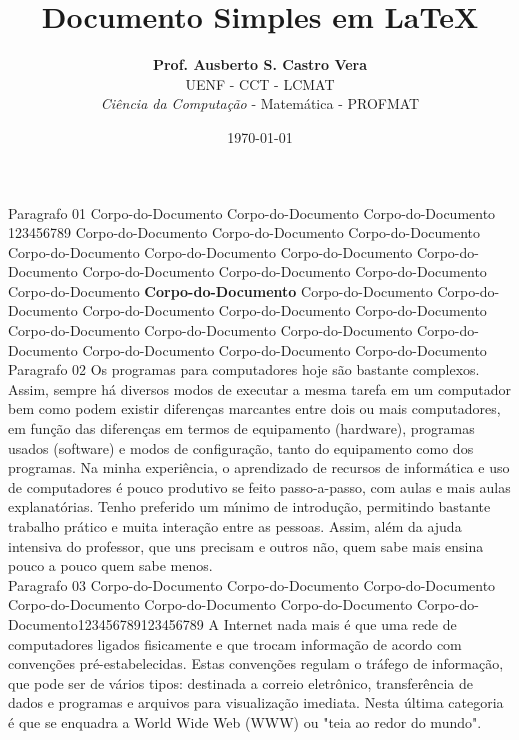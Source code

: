 \documentclass{article}  %
\title{\Huge Documento Simples em \LaTeX}                  %
\author{\textbf{Prof. Ausberto S. Castro Vera} \\          %
	UENF - CCT - LCMAT \\
	\textit{Ci\^{e}ncia da Computa\c{c}\~{a}o} - Matem\'{a}tica - PROFMAT           %
}
\date{\today}    %
\begin{document}
	\maketitle     %
	
	
	Paragrafo 01
	Corpo-do-Documento Corpo-do-Documento Corpo-do-Documento 123456789 Corpo-do-Documento Corpo-do-Documento Corpo-do-Documento
	Corpo-do-Documento Corpo-do-Documento Corpo-do-Documento
	Corpo-do-Documento Corpo-do-Documento Corpo-do-Documento
	Corpo-do-Documento Corpo-do-Documento \textbf{Corpo-do-Documento}
	Corpo-do-Documento Corpo-do-Documento Corpo-do-Documento
	Corpo-do-Documento Corpo-do-Documento Corpo-do-Documento
	Corpo-do-Documento Corpo-do-Documento Corpo-do-Documento
	Corpo-do-Documento Corpo-do-Documento Corpo-do-Documento\\
	
	Paragrafo 02
	Os programas para computadores hoje s\~{a}o bastante complexos. Assim, sempre h\'{a} diversos modos de executar a mesma tarefa em um computador bem como podem existir diferen\c{c}as marcantes entre dois ou mais computadores, em fun\c{c}\~{a}o das diferen\c{c}as em termos de equipamento (hardware), programas usados (software) e modos de configura\c{c}\~{a}o, tanto do equipamento como dos programas.
	Na minha experi\^{e}ncia, o aprendizado de recursos de inform\'{a}tica e uso de computadores \'{e} pouco produtivo se feito passo-a-passo, com aulas e mais aulas explanat\'{o}rias. Tenho preferido um m\'{\i}nimo de introdu\c{c}\~{a}o, permitindo bastante trabalho pr\'{a}tico e muita intera\c{c}\~{a}o entre as pessoas. Assim, al\'{e}m da ajuda intensiva do professor, que uns precisam e outros n\~{a}o, quem sabe mais ensina pouco a pouco quem sabe menos.\\
	
	
	Paragrafo 03
	Corpo-do-Documento
	Corpo-do-Documento
	Corpo-do-Documento
	Corpo-do-Documento
	Corpo-do-Documento
	Corpo-do-Documento
	Corpo-do-Documento123456789123456789
	A Internet nada mais \'{e} que uma rede de computadores ligados fisicamente e que trocam informa\c{c}\~{a}o de acordo com conven\c{c}\~{o}es pr\'{e}-estabelecidas. Estas conven\c{c}\~{o}es regulam o tr\'{a}fego de informa\c{c}\~{a}o, que pode ser de v\'{a}rios tipos: destinada a correio eletr\^{o}nico, transfer\^{e}ncia de dados e programas e arquivos para visualiza\c{c}\~{a}o imediata. Nesta \'{u}ltima categoria \'{e} que se enquadra a World Wide Web (WWW) ou "teia ao redor do mundo".
	
	
	
	
\end{document}
